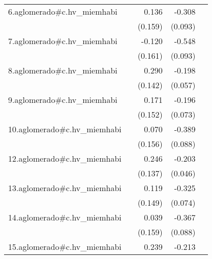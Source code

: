 {\begin{longtable}{l*{4}{D{.}{.}{-1}}}
\addlinespace
6.aglomerado#c.hv\_miemhabi&                     &       0.136         &      -0.308\sym{***}&                     \\
            &                     &     (0.159)         &     (0.093)         &                     \\
\addlinespace
7.aglomerado#c.hv\_miemhabi&                     &      -0.120         &      -0.548\sym{***}&                     \\
            &                     &     (0.161)         &     (0.093)         &                     \\
\addlinespace
8.aglomerado#c.hv\_miemhabi&                     &       0.290\sym{*}  &      -0.198\sym{***}&                     \\
            &                     &     (0.142)         &     (0.057)         &                     \\
\addlinespace
9.aglomerado#c.hv\_miemhabi&                     &       0.171         &      -0.196\sym{**} &                     \\
            &                     &     (0.152)         &     (0.073)         &                     \\
\addlinespace
10.aglomerado#c.hv\_miemhabi&                     &       0.070         &      -0.389\sym{***}&                     \\
            &                     &     (0.156)         &     (0.088)         &                     \\
\addlinespace
12.aglomerado#c.hv\_miemhabi&                     &       0.246         &      -0.203\sym{***}&                     \\
            &                     &     (0.137)         &     (0.046)         &                     \\
\addlinespace
13.aglomerado#c.hv\_miemhabi&                     &       0.119         &      -0.325\sym{***}&                     \\
            &                     &     (0.149)         &     (0.074)         &                     \\
\addlinespace
14.aglomerado#c.hv\_miemhabi&                     &       0.039         &      -0.367\sym{***}&                     \\
            &                     &     (0.159)         &     (0.088)         &                     \\
\addlinespace
15.aglomerado#c.hv\_miemhabi&                     &       0.239         &      -0.213\sym{*}  &                     \\

\end{longtable}}
